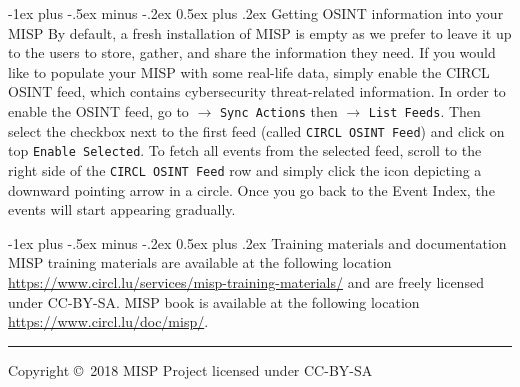 \documentclass[10pt,landscape]{article}
\makeatletter
\renewcommand{\section}{\@startsection{section}{1}{0mm}%
                                {-1ex plus -.5ex minus -.2ex}%
                                {0.5ex plus .2ex}%
                                {\normalfont\large\bfseries}}
\makeatother
\begin{document}
\begin{multicols}{3}
        \section{Getting OSINT information into your MISP}
        By default, a fresh installation of MISP is empty as we prefer to leave it up to the users to store, gather, and share the information they need. If you would like to populate your MISP with some real-life data, simply enable the CIRCL OSINT feed, which contains cybersecurity threat-related information. In order to enable the OSINT feed, go to $\rightarrow$ {\tt Sync Actions} then $\rightarrow$ {\tt List Feeds}. Then select the checkbox next to the first feed (called {\tt CIRCL OSINT Feed}) and click on top {\tt Enable Selected}. To fetch all events from the selected feed, scroll to the right side of the {\tt CIRCL OSINT Feed} row and simply click the icon depicting a downward pointing arrow in a circle. Once you go back to the Event Index, the events will start appearing gradually.

\section{Training materials and documentation}
        MISP training materials are available at the following location \url{https://www.circl.lu/services/misp-training-materials/} and are freely licensed under CC-BY-SA.
        MISP book is available at the following location \url{https://www.circl.lu/doc/misp/}.


\rule{0.3\linewidth}{0.25pt}
\scriptsize

Copyright \copyright\ 2018 MISP Project licensed under CC-BY-SA

\end{multicols}
\end{document}
